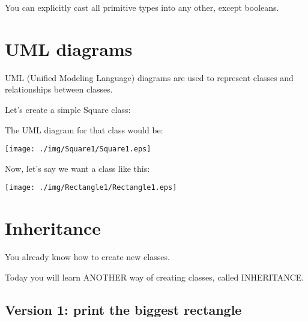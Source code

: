 \documentclass[a4paper, 9pt]{extarticle}
\begin{document}
You can explicitly cast all primitive types into any other, except booleans.










\section{UML diagrams}

UML (Unified Modeling Language) diagrams are used to represent classes and
relationships between classes.

\begin{multicols}{2}
Let's create a simple Square class:


\columnbreak

The UML diagram for that class would be:

\begin{center}
  \texttt{[image: ./img/Square1/Square1.eps]}
\end{center}
\end{multicols}


\begin{multicols}{2}

Now, let's say we want a class like this:

\begin{center}
  \texttt{[image: ./img/Rectangle1/Rectangle1.eps]}
\end{center}

\columnbreak

\end{multicols}














\section{Inheritance}

You already know how to create new classes.

Today you will learn ANOTHER way of creating classes, called INHERITANCE.

\subsection{Version 1: print the biggest rectangle}
\end{document}
